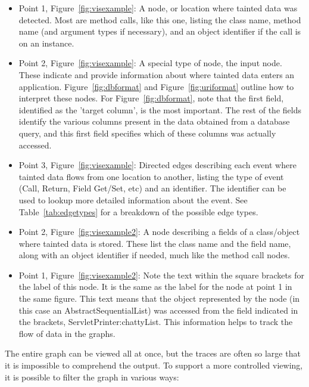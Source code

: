 \documentclass[msc,oneside]{ubcthesis}
\begin{document}
\begin{itemize}
\item Point 1, Figure~\ref{fig:visexample}: A node, or location where tainted data was detected. Most are method calls, like this one, listing the class name, method name (and argument types if necessary), and an object identifier if the call is on an instance.
\item Point 2, Figure~\ref{fig:visexample}: A special type of node, the input node. These indicate and provide information about where tainted data enters an application. Figure~\ref{fig:dbformat} and Figure~\ref{fig:uriformat} outline how to interpret these nodes. For Figure~\ref{fig:dbformat}, note that the first field, identified as the 'target column', is the most important. The rest of the fields identify the various columns present in the data obtained from a database query, and this first field specifies which of these columns was actually accessed.  
\item Point 3, Figure~\ref{fig:visexample}: Directed edges describing each event where tainted data flows from one location to another, listing the type of event (Call, Return, Field Get/Set, etc) and an identifier. The identifier can be used to lookup more detailed information about the event. See Table~\ref{tab:edgetypes} for a breakdown of the possible edge types.
\item Point 2, Figure~\ref{fig:visexample2}: A node describing a fields of a class/object where tainted data is stored. These list the class name and the field name, along with an object identifier if needed, much like the method call nodes.
\item Point 1, Figure~\ref{fig:visexample2}: Note the text within the square brackets for the label of this node. It is the same as the label for the node at point 1 in the same figure. This text means that the object represented by the node (in this case an AbstractSequentialList) was accessed from the field indicated in the brackets, ServletPrinter:chattyList. This information helps to track the flow of data in the graphs. 
\end{itemize}

The entire graph can be viewed all at once, but the traces are often so large that it is impossible to comprehend the output. To support a more controlled viewing, it is possible to filter the graph in various ways:
\end{document}
